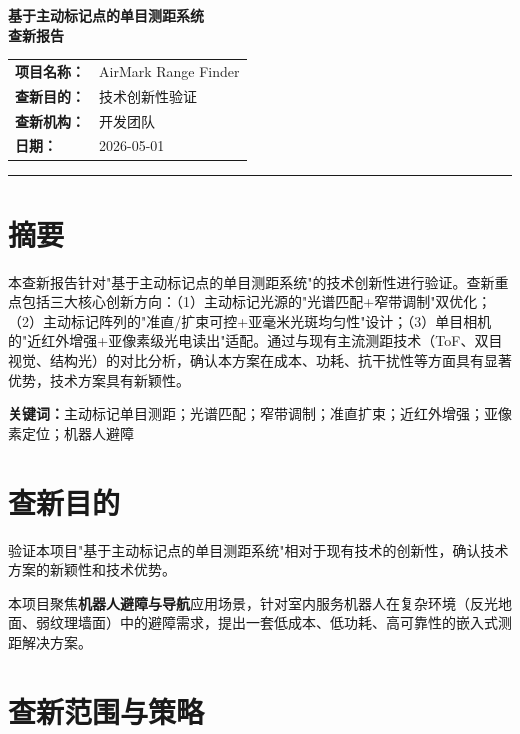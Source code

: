 \documentclass[12pt, a4paper]{ctexart}
\begin{document}
\begin{center}
\fontsize{16pt}{24pt}\selectfont\textbf{基于主动标记点的单目测距系统}\\[0.5em]
\fontsize{14pt}{21pt}\selectfont\textbf{查新报告}
\end{center}

\bigskip

\begin{center}
\begin{tabular}{ll}
\textbf{项目名称：} & AirMark Range Finder \\
\textbf{查新目的：} & 技术创新性验证 \\
\textbf{查新机构：} & 开发团队 \\
\textbf{日期：} & 2026-05-01 \\
\end{tabular}
\end{center}

\bigskip
\hrule
\bigskip

\section*{摘要}

本查新报告针对"基于主动标记点的单目测距系统"的技术创新性进行验证。查新重点包括三大核心创新方向：（1）主动标记光源的"光谱匹配+窄带调制"双优化；（2）主动标记阵列的"准直/扩束可控+亚毫米光斑均匀性"设计；（3）单目相机的"近红外增强+亚像素级光电读出"适配。通过与现有主流测距技术（ToF、双目视觉、结构光）的对比分析，确认本方案在成本、功耗、抗干扰性等方面具有显著优势，技术方案具有新颖性。

\textbf{关键词：}主动标记单目测距；光谱匹配；窄带调制；准直扩束；近红外增强；亚像素定位；机器人避障

\section{查新目的}

验证本项目"基于主动标记点的单目测距系统"相对于现有技术的创新性，确认技术方案的新颖性和技术优势。

本项目聚焦\textbf{机器人避障与导航}应用场景，针对室内服务机器人在复杂环境（反光地面、弱纹理墙面）中的避障需求，提出一套低成本、低功耗、高可靠性的嵌入式测距解决方案。

\section{查新范围与策略}
\end{document}
